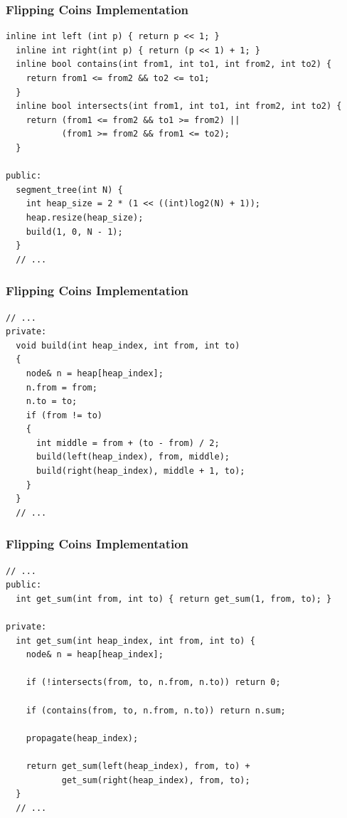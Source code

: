 \documentclass{beamer}
\begin{document}
\begin{frame}[containsverbatim]
\frametitle{Flipping Coins Implementation}

\scriptsize

\begin{lstlisting}[mathescape]
  inline int left (int p) { return p << 1; }
  inline int right(int p) { return (p << 1) + 1; }
  inline bool contains(int from1, int to1, int from2, int to2) {
    return from1 <= from2 && to2 <= to1;
  }
  inline bool intersects(int from1, int to1, int from2, int to2) {
    return (from1 <= from2 && to1 >= from2) ||
           (from1 >= from2 && from1 <= to2);
  }

public:
  segment_tree(int N) {
    int heap_size = 2 * (1 << ((int)log2(N) + 1));
    heap.resize(heap_size);
    build(1, 0, N - 1);
  }
  // ...
\end{lstlisting}

\end{frame}

\begin{frame}[containsverbatim]
\frametitle{Flipping Coins Implementation}

\scriptsize

\begin{lstlisting}[mathescape]
  // ...
private:
  void build(int heap_index, int from, int to)
  {
    node& n = heap[heap_index];
    n.from = from;
    n.to = to;
    if (from != to)
    {
      int middle = from + (to - from) / 2;
      build(left(heap_index), from, middle);
      build(right(heap_index), middle + 1, to);
    }
  }
  // ...
\end{lstlisting}

\end{frame}

\begin{frame}[containsverbatim]
\frametitle{Flipping Coins Implementation}

\scriptsize

\begin{lstlisting}[mathescape]
  // ...
public:
  int get_sum(int from, int to) { return get_sum(1, from, to); }

private:
  int get_sum(int heap_index, int from, int to) {
    node& n = heap[heap_index];

    if (!intersects(from, to, n.from, n.to)) return 0;

    if (contains(from, to, n.from, n.to)) return n.sum;

    propagate(heap_index);

    return get_sum(left(heap_index), from, to) +
           get_sum(right(heap_index), from, to);
  }
  // ...
\end{lstlisting}

\end{frame}
\end{document}
